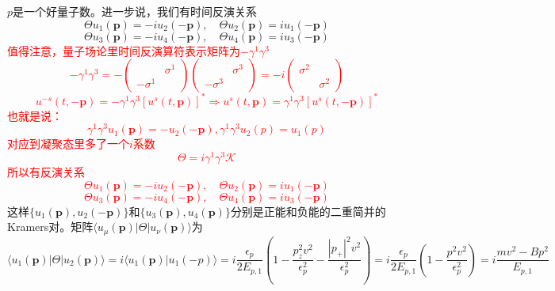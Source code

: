 \documentclass{article}
\numberwithin{equation}{subsection}
\newcommand{\p}{\mathbf{p}}
\begin{document}
$p$是一个好量子数。进一步说，我们有时间反演关系
\begin{equation}
    \Theta u_1(\mathbf{p})=-iu_2(-\mathbf{p}),\quad\Theta u_2(\p)=iu_1(-\p)
\end{equation}
\begin{equation}
    \Theta u_3(\p)=-iu_4(-\p),\quad\Theta u_4(\p)=iu_3(-\p)
\end{equation}
\textcolor{red}{值得注意，量子场论里时间反演算符表示矩阵为$-\gamma^1\gamma^3$
\begin{equation}
    -\gamma^1\gamma^3=-\begin{pmatrix}
        \quad&\sigma^1\\
        -\sigma^1&\quad
    \end{pmatrix}\begin{pmatrix}
        \quad&\sigma^3\\
        -\sigma^3&\quad
    \end{pmatrix}=-i\begin{pmatrix}
        \sigma^2&\quad\\
        \quad&\sigma^2
    \end{pmatrix}
\end{equation}
\begin{equation}
    u^{-s}(t,-\p)=-\gamma^1\gamma^3[u^s(t,\p)]^*\Rightarrow u^s(t,\p)=\gamma^1\gamma^3[u^s(t,-\p)]^*
\end{equation}
也就是说：
\begin{equation}
    \gamma^1\gamma^3 u_1(\p)=-u_2(-\p),\gamma^1\gamma^3u_2(p)=u_1(p)
\end{equation}
对应到凝聚态里多了一个$i$系数
\begin{equation}
    \Theta=i\gamma^1\gamma^3\mathcal{K}
\end{equation}
所以有反演关系
\begin{equation}
    \Theta u_1(\mathbf{p})=-iu_2(-\mathbf{p}),\quad\Theta u_2(\p)=iu_1(-\p)
\end{equation}
\begin{equation}
    \Theta u_3(\p)=-iu_4(-\p),\quad\Theta u_4(\p)=iu_3(-\p)
\end{equation}
}
这样$\{u_1(\p),u_2(-\p)\}$和$\{u_3(\p),u_4(\p)\}$分别是正能和负能的二重简并的Kramers对。矩阵$\langle u_\mu(\p)|\Theta|u_\nu(\p)\rangle$为
\begin{equation}
    \langle u_1(\p)|\Theta|u_2(\p)\rangle=i\langle u_1(\p)|u_1(-p)\rangle=i\frac{\epsilon_p}{2E_{p,1}}(1-\frac{p_z^2v^2}{\epsilon_p^2}-\frac{|p_+|^2v^2}{\epsilon_p^2})=i\frac{\epsilon_p}{2E_{p,1}}(1-\frac{p^2v^2}{\epsilon_p^2})=i\frac{mv^2-Bp^2}{E_{p,1}}
\end{equation}
\end{document}

